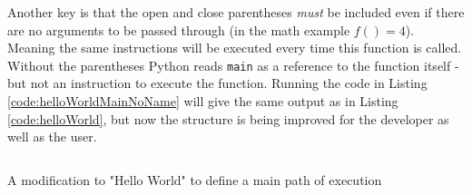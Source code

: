 \documentclass{book}
\newcommand{\python}[3]{
    \usemintedstyle{autumn}
    \begin{listing}[ht]
        \begin{mdframed}[backgroundcolor=codebg]
            \inputminted[linenos]{python}{#1}
        \end{mdframed}
        \caption{#2}
        \label{#3}
    \end{listing}
}
\begin{document}
Another key is that the open and close parentheses \textit{must} be included even if there are no arguments to be passed through (in the math example $f()=4$). Meaning the same instructions will be executed every time this function is called. Without the parentheses Python reads \texttt{main} as a reference to the function itself - but not an instruction to execute the function. Running the code in Listing \ref{code:helloWorldMainNoName} will give the same output as in Listing \ref{code:helloWorld}, but now the structure is being improved for the developer as well as the user.

\python{../../../docCode/chapter1/helloWorldMainNoName.py}
       {A modification to "Hello World" to define a main path of execution}
       {code:helloWorldMainNoName}

%
%
%
\end{document}
